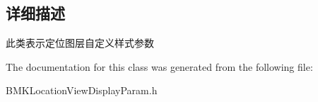 \subsection{详细描述}
此类表示定位图层自定义样式参数 

The documentation for this class was generated from the following file\-:\begin{DoxyCompactItemize}
\item 
B\-M\-K\-Location\-View\-Display\-Param.\-h\end{DoxyCompactItemize}
